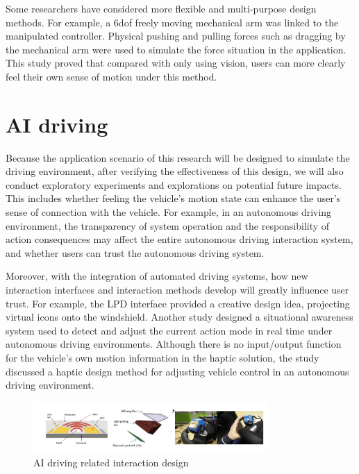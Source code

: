 Some researchers have considered more flexible and multi-purpose design methods. For example, a 6dof freely moving mechanical arm was linked to the manipulated controller\cite{ref_motion005}. Physical pushing and pulling forces such as dragging by the mechanical arm were used to simulate the force situation in the application. This study proved that compared with only using vision, users can more clearly feel their own sense of motion under this method.

\section{AI driving}
Because the application scenario of this research will be designed to simulate the driving environment, after verifying the effectiveness of this design, we will also conduct exploratory experiments and explorations on potential future impacts. This includes whether feeling the vehicle's motion state can enhance the user's sense of connection with the vehicle. For example, in an autonomous driving environment, the transparency of system operation and the responsibility of action consequences may affect the entire autonomous driving interaction system\cite{paper32}, and whether users can trust the autonomous driving system. 

Moreover, with the integration of automated driving systems, how new interaction interfaces and interaction methods develop will greatly influence user trust. For example, the LPD interface\cite{paper33} provided a creative design idea, projecting virtual icons onto the windshield. Another study designed\cite{paper34} a situational awareness system used to detect and adjust the current action mode in real time under autonomous driving environments. Although there is no input/output function for the vehicle's own motion information in the haptic solution, the study\cite{paper35} discussed a haptic design method for adjusting vehicle control in an autonomous driving environment.

\begin{figure}[h]
\centering
\includegraphics[width=0.8\textwidth]{A_thesis/figures/011.png}
\caption{AI driving related interaction design}
\end{figure}


